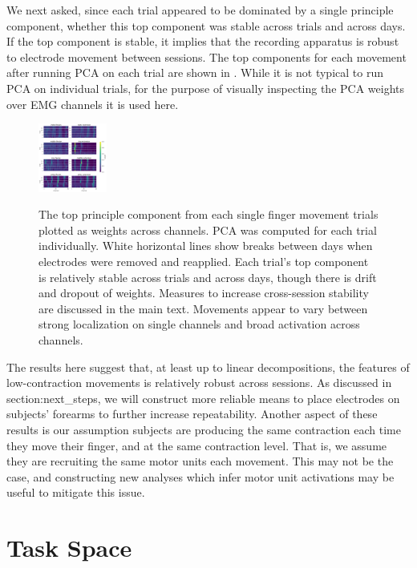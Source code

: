 \documentclass[../main.tex]{subfiles}
\begin{document}
We next asked, since each trial appeared to be dominated by a single principle component, whether this top component was stable across trials and across days. If the top component is stable, it implies that the recording apparatus is robust to electrode movement between sessions. The top components for each movement after running PCA on each trial are shown in . While it is not typical to run PCA on individual trials, for the purpose of visually inspecting the PCA weights over EMG channels it is used here.

\begin{figure}
\label{fig:PCA_components}
\centering
\includegraphics[width=0.2\textwidth]{images/data_analysis/fingers/PCA_components.pdf}
\caption{The top principle component from each single finger movement trials plotted as weights across channels. PCA was computed for each trial individually. White horizontal lines show breaks between days when electrodes were removed and reapplied. Each trial's top component is relatively stable across trials and across days, though there is drift and dropout of weights. Measures to increase cross-session stability are discussed in the main text. Movements appear to vary between strong localization on single channels and broad activation across channels.}\label{fig:PCA_components}
\end{figure}

The results here suggest that, at least up to linear decompositions, the features of low-contraction movements is relatively robust across sessions. As discussed in {section:next\_steps}, we will construct more reliable means to place electrodes on subjects' forearms to further increase repeatability. Another aspect of these results is our assumption subjects are producing the same contraction each time they move their finger, and at the same contraction level. That is, we assume they are recruiting the same motor units each movement. This may not be the case, and constructing new analyses which infer motor unit activations may be useful to mitigate this issue.


\section[short]{Task Space}
\end{document}
